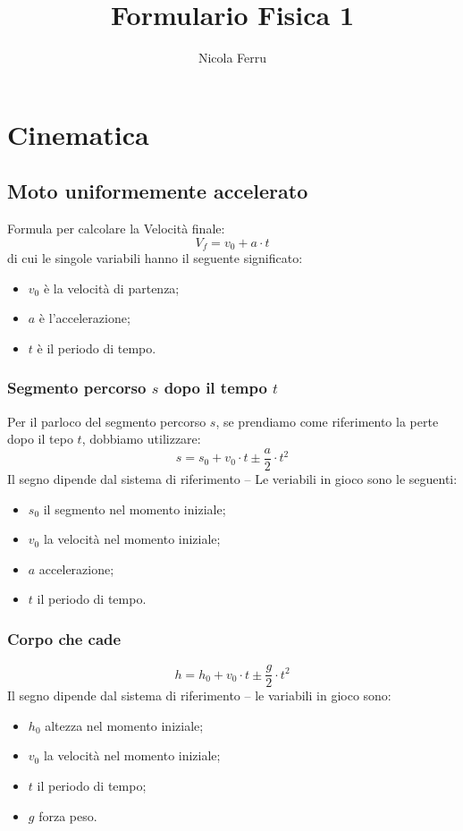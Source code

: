 \documentclass{book}
\title{Formulario Fisica 1}
\author{Nicola Ferru}
\begin{document}
\maketitle
\chapter{Cinematica}
\label{sec:cin}

\section{Moto uniformemente accelerato}
\label{sec:motouniacc}

Formula per calcolare la Velocità finale:
\begin{equation}
  \label{eq:vf}
  V_f=v_0+a\cdot t
\end{equation}
di cui le singole variabili hanno il seguente significato:
\begin{itemize}
\item $v_0$ è la velocità di partenza;
\item $a$ è l'accelerazione;
\item $t$ è il periodo di tempo.
\end{itemize}

\subsection{Segmento percorso $s$ dopo il tempo $t$}
\label{sec:segPDTempt}
Per il parloco del segmento percorso $s$, se prendiamo come riferimento la perte dopo il tepo $t$, dobbiamo utilizzare:
\begin{equation}
  \label{eq:segperdopot}
  s=s_0+v_0\cdot t \pm \frac{a}{2}\cdot t^2
\end{equation}
Il segno dipende dal sistema di riferimento -- Le veriabili in gioco sono le seguenti:
\begin{itemize}
\item $s_0$ il segmento nel momento iniziale;
\item $v_0$ la velocità nel momento iniziale;
\item $a$ accelerazione;
\item $t$ il periodo di tempo.
\end{itemize}

\subsection{Corpo che cade}
\label{sec:corpochecade}
\begin{equation}
  \label{eq:altezzadicaduta}
  h=h_0+v_0\cdot t \pm \frac{g}{2}\cdot t^2
\end{equation}
Il segno dipende dal sistema di riferimento -- le variabili in gioco sono:
\begin{itemize}
\item $h_0$ altezza nel momento iniziale;
\item $v_0$ la velocità nel momento iniziale;
\item $t$ il periodo di tempo;
\item $g$ forza peso.
\end{itemize}
\end{document}
